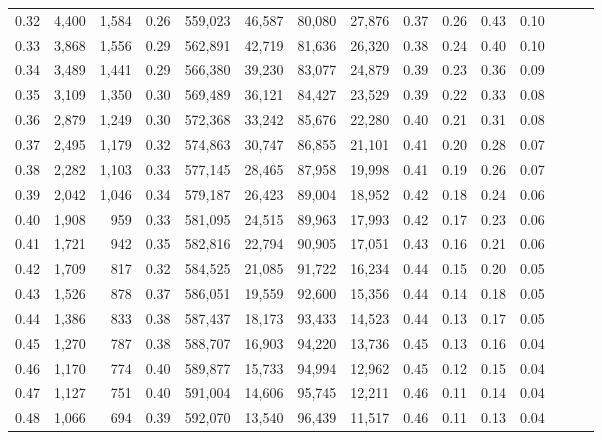\begin{tabular}{rrrrrrrrrrrrrrr}
0.32 &   4,400 &  1,584 &  0.26 &  559,023 &   46,587 &   80,080 &   27,876 &  0.37 &  0.26 &  0.43 &      0.10 \\
0.33 &   3,868 &  1,556 &  0.29 &  562,891 &   42,719 &   81,636 &   26,320 &  0.38 &  0.24 &  0.40 &      0.10 \\
0.34 &   3,489 &  1,441 &  0.29 &  566,380 &   39,230 &   83,077 &   24,879 &  0.39 &  0.23 &  0.36 &      0.09 \\
0.35 &   3,109 &  1,350 &  0.30 &  569,489 &   36,121 &   84,427 &   23,529 &  0.39 &  0.22 &  0.33 &      0.08 \\
0.36 &   2,879 &  1,249 &  0.30 &  572,368 &   33,242 &   85,676 &   22,280 &  0.40 &  0.21 &  0.31 &      0.08 \\
0.37 &   2,495 &  1,179 &  0.32 &  574,863 &   30,747 &   86,855 &   21,101 &  0.41 &  0.20 &  0.28 &      0.07 \\
0.38 &   2,282 &  1,103 &  0.33 &  577,145 &   28,465 &   87,958 &   19,998 &  0.41 &  0.19 &  0.26 &      0.07 \\
0.39 &   2,042 &  1,046 &  0.34 &  579,187 &   26,423 &   89,004 &   18,952 &  0.42 &  0.18 &  0.24 &      0.06 \\
0.40 &   1,908 &    959 &  0.33 &  581,095 &   24,515 &   89,963 &   17,993 &  0.42 &  0.17 &  0.23 &      0.06 \\
0.41 &   1,721 &    942 &  0.35 &  582,816 &   22,794 &   90,905 &   17,051 &  0.43 &  0.16 &  0.21 &      0.06 \\
0.42 &   1,709 &    817 &  0.32 &  584,525 &   21,085 &   91,722 &   16,234 &  0.44 &  0.15 &  0.20 &      0.05 \\
0.43 &   1,526 &    878 &  0.37 &  586,051 &   19,559 &   92,600 &   15,356 &  0.44 &  0.14 &  0.18 &      0.05 \\
0.44 &   1,386 &    833 &  0.38 &  587,437 &   18,173 &   93,433 &   14,523 &  0.44 &  0.13 &  0.17 &      0.05 \\
0.45 &   1,270 &    787 &  0.38 &  588,707 &   16,903 &   94,220 &   13,736 &  0.45 &  0.13 &  0.16 &      0.04 \\
0.46 &   1,170 &    774 &  0.40 &  589,877 &   15,733 &   94,994 &   12,962 &  0.45 &  0.12 &  0.15 &      0.04 \\
0.47 &   1,127 &    751 &  0.40 &  591,004 &   14,606 &   95,745 &   12,211 &  0.46 &  0.11 &  0.14 &      0.04 \\
0.48 &   1,066 &    694 &  0.39 &  592,070 &   13,540 &   96,439 &   11,517 &  0.46 &  0.11 &  0.13 &      0.04 \\

\end{tabular}
